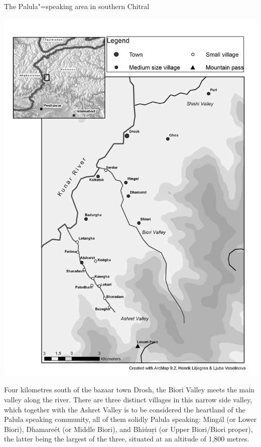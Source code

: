 \begin{mapfigure}[p!]
\caption{The Palula"=speaking area in southern Chitral}
\includegraphics[width=.95\textwidth]{figures/ch1map1.png}
\label{map:1-1}
\end{mapfigure}


Four kilometres south of the bazaar town Drosh, the Biori Valley meets the main valley along the \iliKunar river. There are three distinct villages in this narrow side valley, which together with the Ashret Valley is to be considered the heartland of the Palula speaking community, all of them solidly Palula speaking: Mingál (or Lower Biori), Dhamareét (or Middle Biori), and Bhiúuṛi (or Upper Biori/Biori proper), the latter being the largest of the three, situated at an altitude of 1,800 metres. 


